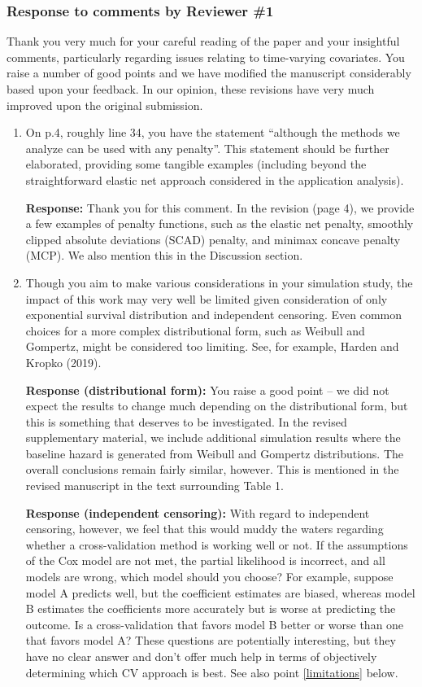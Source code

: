 \documentclass{article}
\newcommand{\re}{\textbf{Response: }}
\begin{document}
\subsubsection*{Response to comments by Reviewer \#1}

Thank you very much for your careful reading of the paper and your insightful comments, particularly regarding issues relating to time-varying covariates. You raise a number of good points and we have modified the manuscript considerably based upon your feedback.  In our opinion, these revisions have very much improved upon the original submission.

\begin{enumerate}[align = left]
\item On p.4, roughly line 34, you have the statement “although the methods we analyze can be used with any penalty”.  This statement should be further elaborated, providing some tangible examples (including beyond the straightforward elastic net approach considered in the application analysis).

\re Thank you for this comment. In the revision (page 4), we provide a few examples of penalty functions, such as the elastic net penalty, smoothly clipped absolute deviations (SCAD) penalty, and minimax concave penalty (MCP). We also mention this in the Discussion section.

\item Though you aim to make various considerations in your simulation study, the impact of this work may very well be limited given consideration of only exponential survival distribution and independent censoring. Even common choices for a more complex distributional form, such as Weibull and Gompertz, might be considered too limiting. See, for example, Harden and Kropko (2019).

\textbf{Response (distributional form):} You raise a good point -- we did not expect the results to change much depending on the distributional form, but this is something that deserves to be investigated. In the revised supplementary material, we include additional simulation results where the baseline hazard is generated from Weibull and Gompertz distributions. The overall conclusions remain fairly similar, however. This is mentioned in the revised manuscript in the text surrounding Table 1.

\textbf{Response (independent censoring):} With regard to independent censoring, however, we feel that this would muddy the waters regarding whether a cross-validation method is working well or not. If the assumptions of the Cox model are not met, the partial likelihood is incorrect, and all models are wrong, which model should you choose? For example, suppose model A predicts well, but the coefficient estimates are biased, whereas model B estimates the coefficients more accurately but is worse at predicting the outcome. Is a cross-validation that favors model B better or worse than one that favors model A? These questions are potentially interesting, but they have no clear answer and don't offer much help in terms of objectively determining which CV approach is best. See also point \ref{limitations} below.


\end{enumerate}
\end{document}
